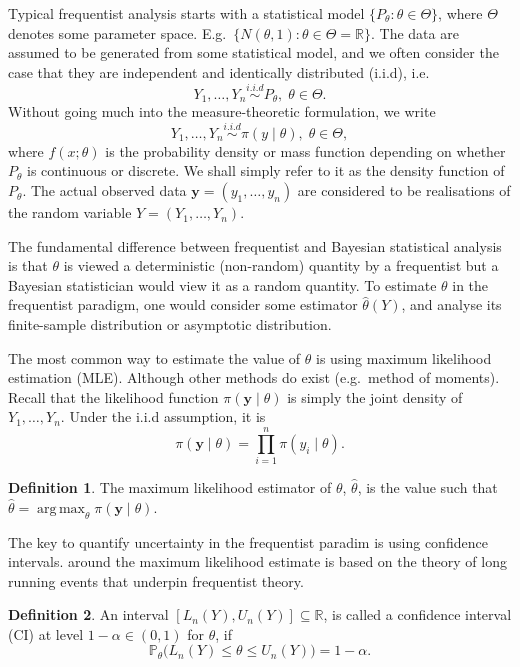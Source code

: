 \documentclass[
]{book}
\theoremstyle{definition}
\newtheorem{definition}{Definition}[chapter]
\theoremstyle{definition}
\theoremstyle{definition}
\theoremstyle{definition}
\theoremstyle{remark}
\begin{document}
Typical frequentist analysis starts with a statistical model \(\{P_\theta: \theta \in \Theta\}\), where \(\Theta\) denotes some parameter space. E.g.~\(\{N(\theta,1) : \theta \in \Theta = \mathbb{R}\}\). The data are assumed to be generated from some statistical model, and we often consider the case that they are independent and identically distributed (i.i.d), i.e.
\[
 Y_1,\dotsc,Y_n \overset{i.i.d}{\sim} P_{\theta}, \; \theta \in \Theta.
\]
Without going much into the measure-theoretic formulation, we write
\[
Y_1,\dotsc,Y_n \overset{i.i.d}{\sim} \pi(y\mid {\theta}),\; \theta \in \Theta,
\]
where \(f(x; {\theta})\) is the probability density or mass function depending on whether \(P_{\theta}\) is continuous or discrete. We shall simply refer to it as the density function of \(P_{\theta}\). The actual observed data \(\boldsymbol{y} = (y_1,\dotsc,y_n)\) are considered to be realisations of the random variable \(Y = (Y_1,\dotsc,Y_n)\).

The fundamental difference between frequentist and Bayesian statistical analysis is that \(\theta\) is viewed a deterministic (non-random) quantity by a frequentist but a Bayesian statistician would view it as a random quantity. To estimate \(\theta\) in the frequentist paradigm, one would consider some estimator \(\hat{\theta}(Y)\), and analyse its finite-sample distribution or asymptotic distribution.

The most common way to estimate the value of \(\theta\) is using maximum likelihood estimation (MLE). Although other methods do exist (e.g.~method of moments). Recall that the likelihood function \(\pi(\boldsymbol{y} \mid \theta)\) is simply the joint density of \(Y_1,\dotsc,Y_n\). Under the i.i.d assumption, it is
\[
\pi(\boldsymbol{y} \mid \theta) = \prod_{i=1}^n \pi(y_i\mid \theta).
\]

\begin{definition}
The maximum likelihood estimator of \(\theta\), \(\hat{\theta}\), is the value such that \(\hat{\theta} = \mathop{\mathrm{arg\,max}}_{\theta} \pi(\boldsymbol{y}\mid \theta)\).
\end{definition}

The key to quantify uncertainty in the frequentist paradim is using confidence intervals. around the maximum likelihood estimate is based on the theory of long running events that underpin frequentist theory.

\begin{definition}
An interval \([L_n(Y), U_n(Y)] \subseteq \mathbb{R}\), is called a confidence interval (CI) at level \(1 - \alpha \in (0,1)\) for \(\theta\), if
\[ \mathbb{P}_\theta\big(L_n(Y) \leq \theta \leq U_n(Y)\big) = 1 - \alpha.
\]
\end{definition}
\end{document}
